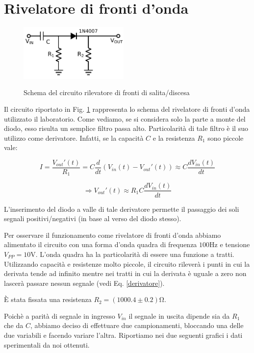 \section{Rivelatore di fronti d'onda}
\begin{figure}
	\caption{Schema del circuito rilevatore di fronti di salita/discesa}
	\includegraphics[width=54mm]{schema_peak_detector.pdf}
	\label{fig:schema_peak_detector}
\end{figure}

Il circuito riportato in Fig. \ref{fig:schema_peak_detector} rappresenta lo schema del rivelatore di fronti d'onda utilizzato il laboratorio. Come vediamo, se si considera solo la parte a monte del diodo, esso risulta un semplice filtro passa alto. Particolarità di tale filtro è il suo utilizzo come derivatore. Infatti, se la capacità $C$ e la resistenza $R_1$ sono piccole vale:

$$ I=\frac{V_{out}'(t)}{R_1}=C\frac{d}{dt}(V_{in}(t)-V_{out}'(t)) \approx C \frac{dV_{in}(t)}{dt} $$

\begin{equation} 
\Rightarrow V_{out}'(t) \approx R_1C \frac{dV_{in}(t)}{dt} 
\label{derivatore}
\end{equation}

L'inserimento del diodo a valle di tale derivatore permette il passaggio dei soli segnali positivi/negativi (in base al verso del diodo stesso).

Per osservare il funzionamento come rivelatore di fronti d'onda abbiamo alimentato il circuito con una forma d'onda quadra di frequenza $100 \si{\hertz}$ e tensione $V_{PP}=10 \si{\volt}$. L'onda quadra ha la particolarità di essere una funzione a tratti. Utilizzando capacità e resistenze molto piccole, il circuito rileverà i punti in cui la derivata tende ad infinito mentre nei tratti in cui la derivata è uguale a zero non lascerà passare nessun segnale (vedi Eq. \ref{derivatore}).

È stata fissata una resistenza $R_2=(1000.4 \pm 0.2) \si{\ohm}$. 

Poichè a parità di segnale in ingresso $V_{in}$ il segnale in uscita dipende sia da $R_1$ che da $C$, abbiamo deciso di effettuare due campionamenti, bloccando una delle due variabili e facendo variare l'altra. Riportiamo nei due seguenti grafici i dati sperimentali da noi ottenuti.

